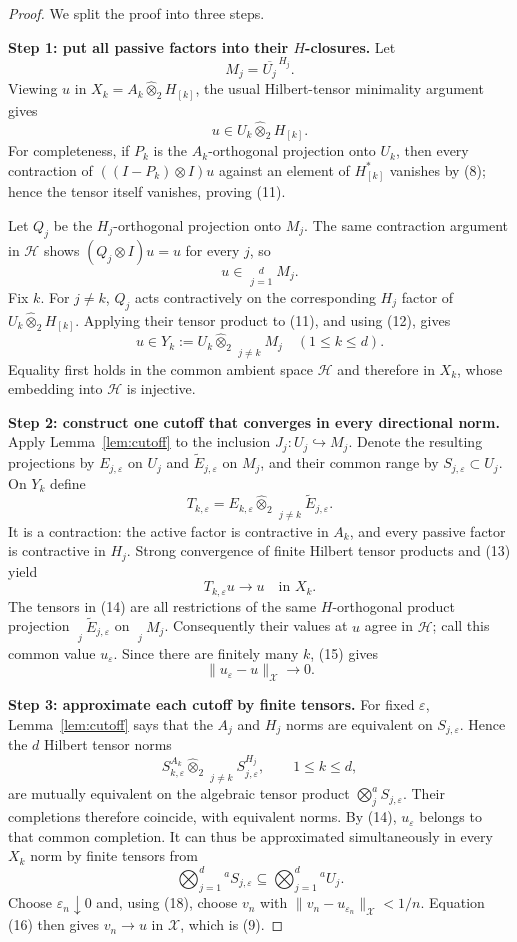 \documentclass[11pt]{article}
\newcommand{\cX}{\mathcal X}
\newcommand{\cH}{\mathcal H}
\newcommand{\clos}[1]{\overline{#1}}
\newcommand{\hot}{\widehat\otimes_2}
\newcommand{\HT}{\mathop{\widehat\bigotimes}\limits}
\begin{document}
\begin{proof}
We split the proof into three steps.

\medskip\noindent
\textbf{Step 1: put all passive factors into their $H$-closures.}
Let
\[
 M_j=\clos{U_j}^{\,H_j}.
 \tag{10}
\]
Viewing $u$ in $X_k=A_k\hot H_{[k]}$, the usual Hilbert-tensor minimality
argument gives
\[
 u\in U_k\hot H_{[k]}.
 \tag{11}
\]
For completeness, if $P_k$ is the $A_k$-orthogonal projection onto $U_k$,
then every contraction of $((I-P_k)\otimes I)u$ against an element of
$H_{[k]}^*$ vanishes by (8); hence the tensor itself vanishes, proving (11).

Let $Q_j$ be the $H_j$-orthogonal projection onto $M_j$.  The same
contraction argument in $\cH$ shows $(Q_j\otimes I)u=u$ for every $j$, so
\[
 u\in\HT_{j=1}^dM_j.
 \tag{12}
\]
Fix $k$.  For $j\ne k$, $Q_j$ acts contractively on the corresponding
$H_j$ factor of $U_k\hot H_{[k]}$.  Applying their tensor product to (11),
and using (12), gives
\[
 u\in Y_k:=U_k\hot\HT_{j\ne k}M_j
 \quad (1\leq k\leq d).
 \tag{13}
\]
Equality first holds in the common ambient space $\cH$ and therefore in
$X_k$, whose embedding into $\cH$ is injective.

\medskip\noindent
\textbf{Step 2: construct one cutoff that converges in every directional
norm.}
Apply Lemma~\ref{lem:cutoff} to the inclusion
$J_j:U_j\hookrightarrow M_j$.  Denote the resulting projections by
$E_{j,\varepsilon}$ on $U_j$ and $\widetilde E_{j,\varepsilon}$ on $M_j$,
and their common range by $S_{j,\varepsilon}\subset U_j$.
On $Y_k$ define
\[
 T_{k,\varepsilon}
 =E_{k,\varepsilon}\hot
  \HT_{j\ne k}\widetilde E_{j,\varepsilon}.
 \tag{14}
\]
It is a contraction: the active factor is contractive in $A_k$, and every
passive factor is contractive in $H_j$.  Strong convergence of finite Hilbert
tensor products and (13) yield
\[
 T_{k,\varepsilon}u\longrightarrow u
 \quad\text{in }X_k.
 \tag{15}
\]
The tensors in (14) are all restrictions of the same $H$-orthogonal product
projection $\HT_j\widetilde E_{j,\varepsilon}$ on $\HT_jM_j$.
Consequently their values at $u$ agree in $\cH$; call this common value
$u_\varepsilon$.  Since there are finitely many $k$, (15) gives
\[
 \|u_\varepsilon-u\|_{\cX}\longrightarrow0.
 \tag{16}
\]

\medskip\noindent
\textbf{Step 3: approximate each cutoff by finite tensors.}
For fixed $\varepsilon$, Lemma~\ref{lem:cutoff} says that the $A_j$ and
$H_j$ norms are equivalent on $S_{j,\varepsilon}$.  Hence the $d$ Hilbert
tensor norms
\[
 S_{k,\varepsilon}^{A_k}\hot
 \HT_{j\ne k}S_{j,\varepsilon}^{H_j},
 \qquad 1\leq k\leq d,
 \tag{17}
\]
are mutually equivalent on the algebraic tensor product
$\bigotimes_j^a S_{j,\varepsilon}$.  Their completions therefore coincide,
with equivalent norms.  By (14), $u_\varepsilon$ belongs to that common
completion.  It can thus be approximated simultaneously in every $X_k$ norm
by finite tensors from
\[
 \bigotimes_{j=1}^d{}^aS_{j,\varepsilon}
 \subseteq\bigotimes_{j=1}^d{}^aU_j.
 \tag{18}
\]
Choose $\varepsilon_n\downarrow0$ and, using (18), choose $v_n$ with
$\|v_n-u_{\varepsilon_n}\|_{\cX}<1/n$.  Equation (16) then gives
$v_n\to u$ in $\cX$, which is (9).
\end{proof}
\end{document}
